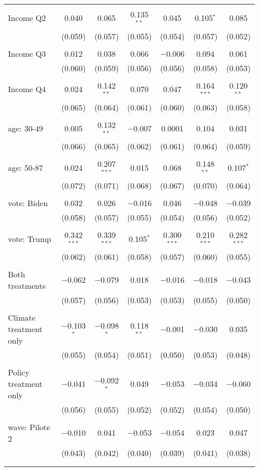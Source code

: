 \begin{tabular}{@{\extracolsep{5pt}}lcccccc}
  & & & & & & \\ 
 Income Q2 & 0.040 & 0.065 & 0.135$^{**}$ & 0.045 & 0.105$^{*}$ & 0.085 \\ 
  & (0.059) & (0.057) & (0.055) & (0.054) & (0.057) & (0.052) \\ 
  & & & & & & \\ 
 Income Q3 & 0.012 & 0.038 & 0.066 & $-$0.006 & 0.094 & 0.061 \\ 
  & (0.060) & (0.059) & (0.056) & (0.056) & (0.058) & (0.053) \\ 
  & & & & & & \\ 
 Income Q4 & 0.024 & 0.142$^{**}$ & 0.070 & 0.047 & 0.164$^{***}$ & 0.120$^{**}$ \\ 
  & (0.065) & (0.064) & (0.061) & (0.060) & (0.063) & (0.058) \\ 
  & & & & & & \\ 
 age: 30-49 & 0.005 & 0.132$^{**}$ & $-$0.007 & 0.0001 & 0.104 & 0.031 \\ 
  & (0.066) & (0.065) & (0.062) & (0.061) & (0.064) & (0.059) \\ 
  & & & & & & \\ 
 age: 50-87 & 0.024 & 0.207$^{***}$ & 0.015 & 0.068 & 0.148$^{**}$ & 0.107$^{*}$ \\ 
  & (0.072) & (0.071) & (0.068) & (0.067) & (0.070) & (0.064) \\ 
  & & & & & & \\ 
 vote: Biden & 0.032 & 0.026 & $-$0.016 & 0.046 & $-$0.048 & $-$0.039 \\ 
  & (0.058) & (0.057) & (0.055) & (0.054) & (0.056) & (0.052) \\ 
  & & & & & & \\ 
 vote: Trump & 0.342$^{***}$ & 0.339$^{***}$ & 0.105$^{*}$ & 0.300$^{***}$ & 0.210$^{***}$ & 0.282$^{***}$ \\ 
  & (0.062) & (0.061) & (0.058) & (0.057) & (0.060) & (0.055) \\ 
  & & & & & & \\ 
 Both treatments & $-$0.062 & $-$0.079 & 0.018 & $-$0.016 & $-$0.018 & $-$0.043 \\ 
  & (0.057) & (0.056) & (0.053) & (0.053) & (0.055) & (0.050) \\ 
  & & & & & & \\ 
 Climate treatment only & $-$0.103$^{*}$ & $-$0.098$^{*}$ & 0.118$^{**}$ & $-$0.001 & $-$0.030 & 0.035 \\ 
  & (0.055) & (0.054) & (0.051) & (0.050) & (0.053) & (0.048) \\ 
  & & & & & & \\ 
 Policy treatment only & $-$0.041 & $-$0.092$^{*}$ & 0.049 & $-$0.053 & $-$0.034 & $-$0.060 \\ 
  & (0.056) & (0.055) & (0.052) & (0.052) & (0.054) & (0.050) \\ 
  & & & & & & \\ 
 wave: Pilote 2 & $-$0.010 & 0.041 & $-$0.053 & $-$0.054 & 0.023 & 0.047 \\ 
  & (0.043) & (0.042) & (0.040) & (0.039) & (0.041) & (0.038) \\ 
  & & & & & & \\ 
\hline \\[-1.8ex] 


\end{tabular}
